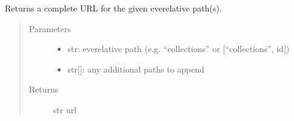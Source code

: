 \documentclass[letterpaper,10pt,english]{sphinxmanual}
\begin{document}
\begin{fulllineitems}
\label{\detokenize{autoapi/pine/backend/data/service/index:pine.backend.data.service.PERFORMANCE_HISTORY}}
\end{fulllineitems}


\begin{fulllineitems}
\label{\detokenize{autoapi/pine/backend/data/service/index:pine.backend.data.service._standardize_path}}
\end{fulllineitems}


\begin{fulllineitems}
\label{\detokenize{autoapi/pine/backend/data/service/index:pine.backend.data.service.url}}
Returns a complete URL for the given eve\sphinxhyphen{}relative path(s).
\begin{quote}\begin{description}
\item[{Parameters}] \leavevmode\begin{itemize}
\item {} 
 \textendash{} str: eve\sphinxhyphen{}relative path (e.g. “collections” or {[}“collections”, id{]})

\item {} 
 \textendash{} str{[}{]}: any additional paths to append

\end{itemize}

\item[{Returns}] \leavevmode
str url

\end{description}\end{quote}

\end{fulllineitems}
\end{document}
